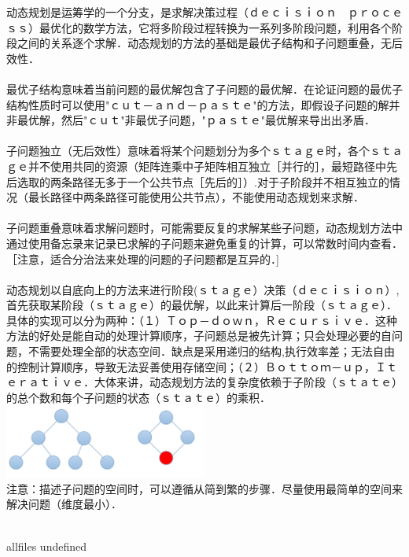 \documentclass[a4paper,10pt]{article}
\begin{document}
\begin{CJK}{UTF8}{gbsn}     %

\else

动态规划是运筹学的一个分支，是求解决策过程（ｄｅｃｉｓｉｏｎ　ｐｒｏｃｅｓｓ）最优化的数学方法，它将多阶段过程转换为一系列多阶段问题，利用各个阶段之间的关系逐个求解．动态规划的方法的基础是最优子结构和子问题重叠，无后效性．\\
\\
最优子结构意味着当前问题的最优解包含了子问题的最优解．在论证问题的最优子结构性质时可以使用"ｃｕｔ－ａｎｄ－ｐａｓｔｅ"的方法，即假设子问题的解并非最优解，然后"ｃｕｔ"非最优子问题，"ｐａｓｔｅ"最优解来导出出矛盾．\\
\\
子问题独立（无后效性）意味着将某个问题划分为多个ｓｔａｇｅ时，各个ｓｔａｇｅ并不使用共同的资源（矩阵连乘中子矩阵相互独立［并行的］，最短路径中先后选取的两条路径无多于一个公共节点［先后的］）.对于子阶段并不相互独立的情况（最长路径中两条路径可能使用公共节点），不能使用动态规划来求解．\\
\\
子问题重叠意味着求解问题时，可能需要反复的求解某些子问题，动态规划方法中通过使用备忘录来记录已求解的子问题来避免重复的计算，可以常数时间内查看．［注意，适合分治法来处理的问题的子问题都是互异的．]\\
\\
动态规划以自底向上的方法来进行阶段(ｓｔａｇｅ）决策（ｄｅｃｉｓｉｏｎ）,首先获取某阶段（ｓｔａｇｅ）的最优解，以此来计算后一阶段（ｓｔａｇｅ）．具体的实现可以分为两种：（１）Ｔｏｐ－ｄｏｗｎ，Ｒｅｃｕｒｓｉｖｅ．这种方法的好处是能自动的处理计算顺序，子问题总是被先计算；只会处理必要的自问题，不需要处理全部的状态空间．缺点是采用递归的结构,执行效率差；无法自由的控制计算顺序，导致无法妥善使用存储空间；（２）Ｂｏｔｔｏｍ－ｕｐ，Ｉｔｅｒａｔｉｖｅ．大体来讲，动态规划方法的复杂度依赖于子阶段（ｓｔａｔｅ）的总个数和每个子问题的状态（ｓｔａｔｅ）的乘积．\\
\includegraphics[width=0.5\textwidth]{Dynamic-Programming/background/pics0}
\\
注意：描述子问题的空间时，可以遵循从简到繁的步骤．尽量使用最简单的空间来解决问题（维度最小）．\\
\\

\fi

\ifx allfiles undefined
\end{CJK}
\end{document}
